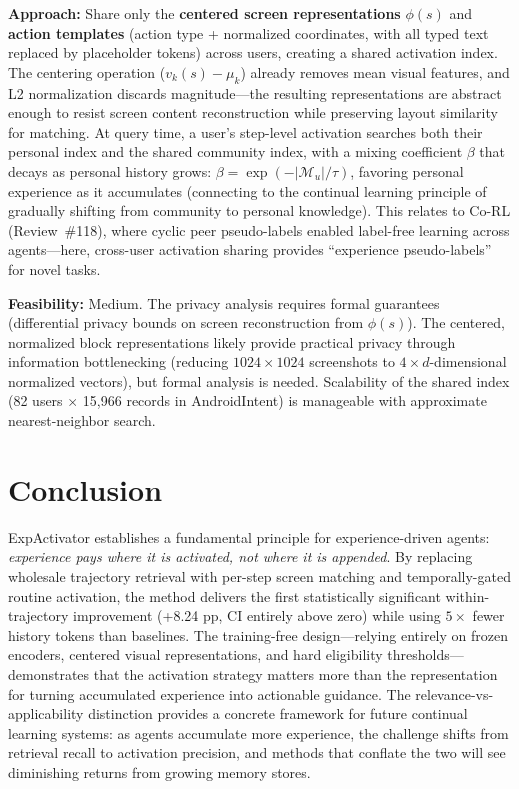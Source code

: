 \documentclass[11pt,a4paper]{article}
\begin{document}
\textbf{Approach:} Share only the \textbf{centered screen representations} $\phi(s)$ and \textbf{action templates} (action type + normalized coordinates, with all typed text replaced by placeholder tokens) across users, creating a shared activation index. The centering operation ($v_k(s) - \mu_k$) already removes mean visual features, and L2 normalization discards magnitude---the resulting representations are abstract enough to resist screen content reconstruction while preserving layout similarity for matching. At query time, a user's step-level activation searches both their personal index and the shared community index, with a mixing coefficient $\beta$ that decays as personal history grows: $\beta = \exp(-|\mathcal{M}_u| / \tau)$, favoring personal experience as it accumulates (connecting to the continual learning principle of gradually shifting from community to personal knowledge). This relates to Co-RL (Review~\#118), where cyclic peer pseudo-labels enabled label-free learning across agents---here, cross-user activation sharing provides ``experience pseudo-labels'' for novel tasks.

\textbf{Feasibility:} Medium. The privacy analysis requires formal guarantees (differential privacy bounds on screen reconstruction from $\phi(s)$). The centered, normalized block representations likely provide practical privacy through information bottlenecking (reducing $1024 \times 1024$ screenshots to $4 \times d$-dimensional normalized vectors), but formal analysis is needed. Scalability of the shared index (82 users $\times$ 15,966 records in AndroidIntent) is manageable with approximate nearest-neighbor search.

\section{Conclusion}
ExpActivator establishes a fundamental principle for experience-driven agents: \emph{experience pays where it is activated, not where it is appended}. By replacing wholesale trajectory retrieval with per-step screen matching and temporally-gated routine activation, the method delivers the first statistically significant within-trajectory improvement (+8.24 pp, CI entirely above zero) while using $5\times$ fewer history tokens than baselines. The training-free design---relying entirely on frozen encoders, centered visual representations, and hard eligibility thresholds---demonstrates that the activation strategy matters more than the representation for turning accumulated experience into actionable guidance. The relevance-vs-applicability distinction provides a concrete framework for future continual learning systems: as agents accumulate more experience, the challenge shifts from retrieval recall to activation precision, and methods that conflate the two will see diminishing returns from growing memory stores.
\end{document}
